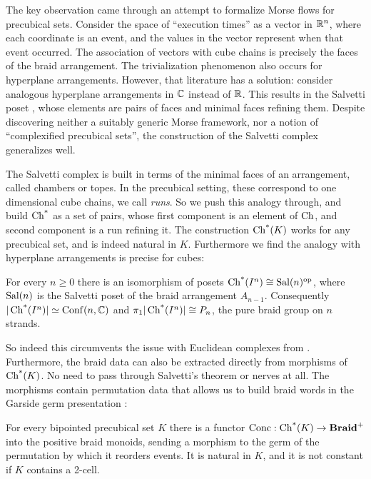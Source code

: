 \documentclass[11pt]{article}
\begin{document}
The key observation came through an attempt to formalize Morse flows for precubical sets.
Consider the space of ``execution times'' as a vector in $\mathbb{R}^n$, where each coordinate is an event,
and the values in the vector represent when that event occurred.
The association of vectors with cube chains is precisely the faces of the braid arrangement.
The trivialization phenomenon also occurs for hyperplane arrangements.
However, that literature has a solution: consider analogous hyperplane arrangements in $\mathbb{C}$ instead of $\mathbb{R}$. 
This results in the Salvetti poset \cite{Paris}, whose elements are
pairs of faces and minimal faces refining them.
Despite discovering neither a suitably generic Morse framework, nor a notion of ``complexified precubical sets'',
the construction of the Salvetti complex generalizes well.

The Salvetti complex is built in terms of the minimal faces of an arrangement, called chambers or topes.
In the precubical setting, these correspond to one dimensional cube chains, we call \emph{runs}. 
So we push this analogy through, and build $\operatorname{Ch^*}$ as a set of pairs, whose first component is an element of $\operatorname{Ch}$, 
and second component is a run refining it. The construction $\operatorname{Ch^*}(K)$ works for any precubical set, and is indeed natural in $K$. 
Furthermore we find the analogy with hyperplane arrangements is precise for cubes:
\begin{theorem}\label{thm:A}
  For every $n \ge 0$ there is an isomorphism of posets $\operatorname{Ch^*}(I^{n}) \cong \operatorname{Sal}(n)^{\mathrm{op}}$, where
  $\operatorname{Sal}(n)$ is the Salvetti poset of the braid arrangement $A_{n-1}$. Consequently
  $|\operatorname{Ch^*}(I^{n})| \simeq \operatorname{Conf}(n, \mathbb{C})$ and $\pi_1|\operatorname{Ch^*}(I^{n})| \cong P_n$, the pure braid group
  on $n$ strands. 
\end{theorem}

So indeed this circumvents the issue with Euclidean complexes from {\cite[Prop.~6.1]{PZ}}.
Furthermore, the braid data can also be extracted directly from morphisms of $\operatorname{Ch^*}(K)$. 
No need to pass through Salvetti's theorem or nerves at all. 
The morphisms contain permutation data that allows us to build braid words in the 
Garside germ presentation \cite{Garsidebook}:
\begin{theorem}\label{thm:B}
  For every bipointed precubical set $K$ there is a functor $\operatorname{Conc} : \operatorname{Ch^*}(K) \to \mathbf{Braid}^{+}$ into
  the positive braid monoids, sending a morphism to the germ of the permutation by which it
  reorders events. It is natural in $K$, and it is not constant if $K$ contains a 2-cell.
\end{theorem}
\end{document}
